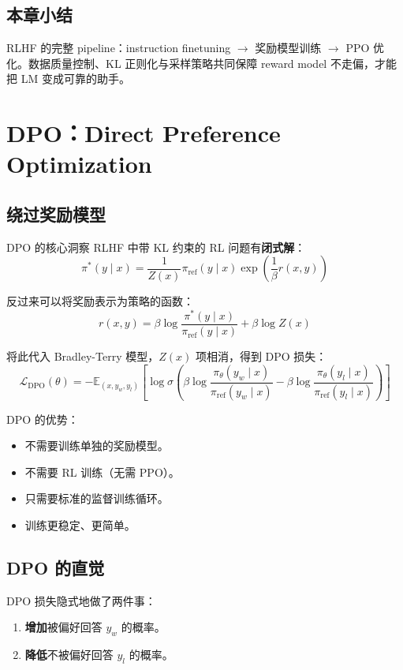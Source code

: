 \documentclass[a4paper]{article}
\begin{document}
\subsection{本章小结}

RLHF 的完整 pipeline：instruction finetuning $\to$ 奖励模型训练 $\to$ PPO 优化。数据质量控制、KL 正则化与采样策略共同保障 reward model 不走偏，才能把 LM 变成可靠的助手。

\section{DPO：Direct Preference Optimization}

\subsection{绕过奖励模型}

\begin{importantbox}{DPO 的核心洞察}
RLHF 中带 KL 约束的 RL 问题有\textbf{闭式解}：
$$\pi^*(y \mid x) = \frac{1}{Z(x)} \pi_{\mathrm{ref}}(y \mid x) \exp\left(\frac{1}{\beta} r(x, y)\right)$$

反过来可以将奖励表示为策略的函数：
$$r(x, y) = \beta \log \frac{\pi^*(y \mid x)}{\pi_{\mathrm{ref}}(y \mid x)} + \beta \log Z(x)$$

将此代入 Bradley-Terry 模型，$Z(x)$ 项相消，得到 DPO 损失：
$$\mathcal{L}_{\mathrm{DPO}}(\theta) = -\mathbb{E}_{(x, y_w, y_l)}\left[\log \sigma\left(\beta \log \frac{\pi_\theta(y_w \mid x)}{\pi_{\mathrm{ref}}(y_w \mid x)} - \beta \log \frac{\pi_\theta(y_l \mid x)}{\pi_{\mathrm{ref}}(y_l \mid x)}\right)\right]$$
\end{importantbox}

DPO 的优势：
\begin{itemize}
    \item 不需要训练单独的奖励模型。
    \item 不需要 RL 训练（无需 PPO）。
    \item 只需要标准的监督训练循环。
    \item 训练更稳定、更简单。
\end{itemize}

\subsection{DPO 的直觉}

DPO 损失隐式地做了两件事：
\begin{enumerate}
    \item \textbf{增加}被偏好回答 $y_w$ 的概率。
    \item \textbf{降低}不被偏好回答 $y_l$ 的概率。
\end{enumerate}
\end{document}
